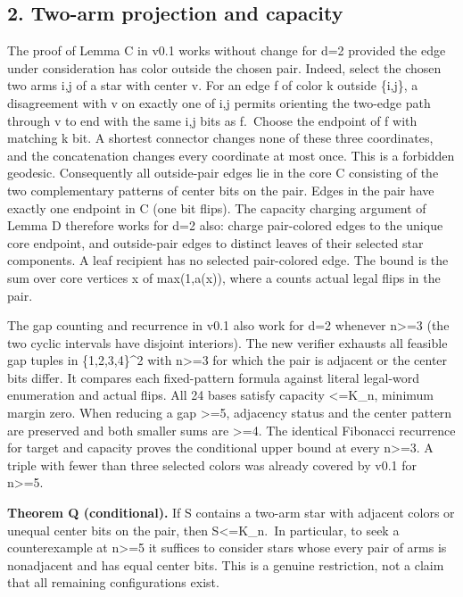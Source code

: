 \documentclass[
  10pt,
]{article}
\begin{document}
\subsection{2. Two-arm projection and
capacity}\label{two-arm-projection-and-capacity}

The proof of Lemma C in v0.1 works without change for d=2 provided the
edge under consideration has color outside the chosen pair. Indeed,
select the chosen two arms i,j of a star with center v. For an edge f of
color k outside \{i,j\}, a disagreement with v on exactly one of i,j
permits orienting the two-edge path through v to end with the same i,j
bits as f.~Choose the endpoint of f with matching k bit. A shortest
connector changes none of these three coordinates, and the concatenation
changes every coordinate at most once. This is a forbidden geodesic.
Consequently all outside-pair edges lie in the core C consisting of the
two complementary patterns of center bits on the pair. Edges in the pair
have exactly one endpoint in C (one bit flips). The capacity charging
argument of Lemma D therefore works for d=2 also: charge pair-colored
edges to the unique core endpoint, and outside-pair edges to distinct
leaves of their selected star components. A leaf recipient has no
selected pair-colored edge. The bound is the sum over core vertices x of
max(1,a(x)), where a counts actual legal flips in the pair.

The gap counting and recurrence in v0.1 also work for d=2 whenever
n\textgreater=3 (the two cyclic intervals have disjoint interiors). The
new verifier exhausts all feasible gap tuples in \{1,2,3,4\}\^{}2 with
n\textgreater=3 for which the pair is adjacent or the center bits
differ. It compares each fixed-pattern formula against literal
legal-word enumeration and actual flips. All 24 bases satisfy capacity
\textless=K\_n, minimum margin zero. When reducing a gap \textgreater=5,
adjacency status and the center pattern are preserved and both smaller
sums are \textgreater=4. The identical Fibonacci recurrence for target
and capacity proves the conditional upper bound at every
n\textgreater=3. A triple with fewer than three selected colors was
already covered by v0.1 for n\textgreater=5.

\textbf{Theorem Q (conditional).} If S contains a two-arm star with
adjacent colors or unequal center bits on the pair, then
\textbar S\textbar\textless=K\_n.~In particular, to seek a
counterexample at n\textgreater=5 it suffices to consider stars whose
every pair of arms is nonadjacent and has equal center bits. This is a
genuine restriction, not a claim that all remaining configurations
exist.
\end{document}

